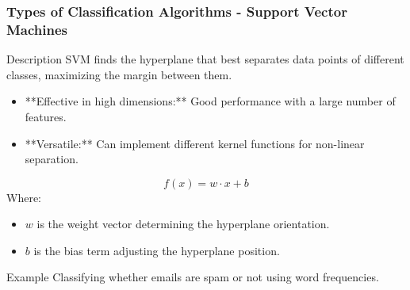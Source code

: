 \documentclass{beamer}
\begin{document}
\begin{frame}[fragile]
    \frametitle{Types of Classification Algorithms - Support Vector Machines}
    \begin{block}{Description}
    SVM finds the hyperplane that best separates data points of different classes, maximizing the margin between them.
    \end{block}

    \begin{itemize}
        \item **Effective in high dimensions:** Good performance with a large number of features.
        \item **Versatile:** Can implement different kernel functions for non-linear separation.
    \end{itemize}

    \begin{equation}
    f(x) = w \cdot x + b
    \end{equation}
    Where:
    \begin{itemize}
        \item \( w \) is the weight vector determining the hyperplane orientation.
        \item \( b \) is the bias term adjusting the hyperplane position.
    \end{itemize}
    
    \begin{block}{Example}
    Classifying whether emails are spam or not using word frequencies.
    \end{block}
\end{frame}
\end{document}
